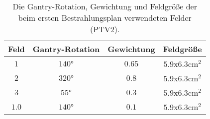 \begin{table}
	\centering
	\caption{Die Gantry-Rotation, Gewichtung und Feldgröße der beim ersten Bestrahlungsplan verwendeten Felder (PTV2).}
	\label{tab:Felder2}
	\begin{tabular}{c c c c}
		\toprule
		Feld & Gantry-Rotation & Gewichtung & Feldgröße\\
		\midrule
		$1$ & $140°$   & $0.65$ & $\num{5.9}$x$\num{6.3} \si{\centi\meter\squared}$ \\
		$2$ & $320°$  & $0.8$ & $\num{5.9}$x$\num{6.3} \si{\centi\meter\squared}$ \\
		$3$ & $55°$ & $0.3$ & $\num{5.9}$x$\num{6.3} \si{\centi\meter\squared}$ \\
		$1.0$ & $140°$ & $0.1$ & $\num{5.9}$x$\num{6.3} \si{\centi\meter\squared}$ \\
		\bottomrule
	\end{tabular}
\end{table}
